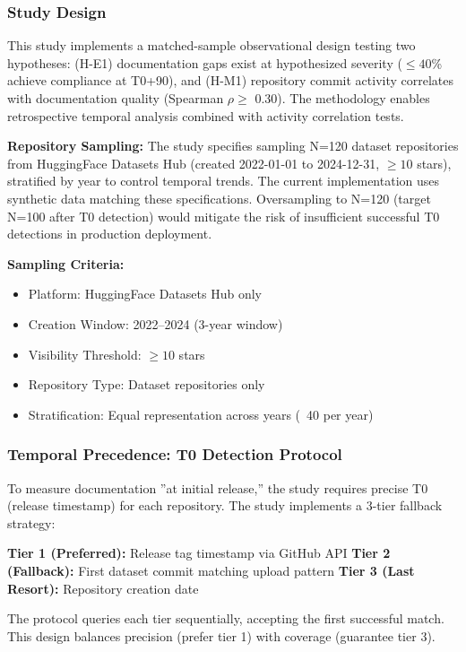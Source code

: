 
\subsubsection{Study Design}

This study implements a matched-sample observational design testing two hypotheses: (H-E1) documentation gaps exist at hypothesized severity ($\leq 40$\% achieve compliance at T0+90), and (H-M1) repository commit activity correlates with documentation quality (Spearman $\rho \geq$ 0.30). The methodology enables retrospective temporal analysis combined with activity correlation tests.

\textbf{Repository Sampling:} The study specifies sampling N=120 dataset repositories from HuggingFace Datasets Hub (created 2022-01-01 to 2024-12-31, $\geq 10$ stars), stratified by year to control temporal trends. The current implementation uses synthetic data matching these specifications. Oversampling to N=120 (target N=100 after T0 detection) would mitigate the risk of insufficient successful T0 detections in production deployment.

\textbf{Sampling Criteria:}
\begin{itemize}
\item Platform: HuggingFace Datasets Hub only
\item Creation Window: 2022--2024 (3-year window)
\item Visibility Threshold: $\geq 10$ stars
\item Repository Type: Dataset repositories only
\item Stratification: Equal representation across years (~40 per year)
\end{itemize}

\subsubsection{Temporal Precedence: T0 Detection Protocol}

To measure documentation ''at initial release,'' the study requires precise T0 (release timestamp) for each repository. The study implements a 3-tier fallback strategy:

\textbf{Tier 1 (Preferred):} Release tag timestamp via GitHub API  
\textbf{Tier 2 (Fallback):} First dataset commit matching upload pattern  
\textbf{Tier 3 (Last Resort):} Repository creation date

The protocol queries each tier sequentially, accepting the first successful match. This design balances precision (prefer tier 1) with coverage (guarantee tier 3).

